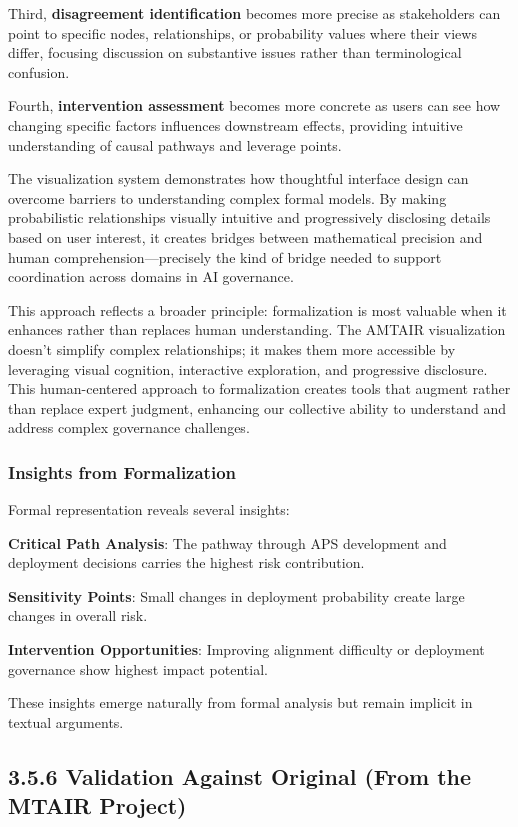 \documentclass[
  11pt,
  letterpaper,
]{book}
\begin{document}
\begin{landscape}
Third, \textbf{disagreement identification} becomes more precise as
stakeholders can point to specific nodes, relationships, or probability
values where their views differ, focusing discussion on substantive
issues rather than terminological confusion.

Fourth, \textbf{intervention assessment} becomes more concrete as users
can see how changing specific factors influences downstream effects,
providing intuitive understanding of causal pathways and leverage
points.

The visualization system demonstrates how thoughtful interface design
can overcome barriers to understanding complex formal models. By making
probabilistic relationships visually intuitive and progressively
disclosing details based on user interest, it creates bridges between
mathematical precision and human comprehension---precisely the kind of
bridge needed to support coordination across domains in AI governance.

This approach reflects a broader principle: formalization is most
valuable when it enhances rather than replaces human understanding. The
AMTAIR visualization doesn't simplify complex relationships; it makes
them more accessible by leveraging visual cognition, interactive
exploration, and progressive disclosure. This human-centered approach to
formalization creates tools that augment rather than replace expert
judgment, enhancing our collective ability to understand and address
complex governance challenges.

\subsubsection*{\texorpdfstring{\textbf{Insights from
Formalization}}{Insights from Formalization}}\label{insights-from-formalization}

Formal representation reveals several insights:

\textbf{Critical Path Analysis}: The pathway through APS development and
deployment decisions carries the highest risk contribution.

\textbf{Sensitivity Points}: Small changes in deployment probability
create large changes in overall risk.

\textbf{Intervention Opportunities}: Improving alignment difficulty or
deployment governance show highest impact potential.

These insights emerge naturally from formal analysis but remain implicit
in textual arguments.

\subsection*{3.5.6 Validation Against Original (From the MTAIR
Project)}\label{sec-carlsmith-validation}

\end{landscape}
\end{document}
